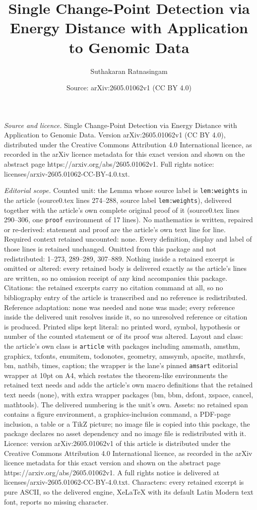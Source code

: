 \documentclass[10pt,a4paper]{amsart}
\title[Single Change-Point Detection via Energy Distance with Appli]{Single Change-Point Detection via Energy Distance with Application to Genomic Data}
\author{Suthakaran Ratnasingam}
\date{Source: arXiv:2605.01062v1 (CC BY 4.0)}
\begin{document}
\maketitle

\noindent\emph{Source and licence.} Single Change-Point Detection via Energy Distance with Application to Genomic Data. Version arXiv:2605.01062v1 (CC BY 4.0), distributed under the Creative Commons Attribution 4.0 International licence, as recorded in the arXiv licence metadata for this exact version and shown on the abstract page https://arxiv.org/abs/2605.01062v1. Full rights notice: licenses/arxiv-2605.01062-CC-BY-4.0.txt.\par\smallskip

\noindent\textit{Editorial scope.} Counted unit: the Lemma whose source label is \texttt{lem:weights} in the article (source0.tex lines 274--288, source label \texttt{lem:weights}), delivered together with the article's own complete original proof of it (source0.tex lines 290--306, one \texttt{proof} environment of 17 lines). No mathematics is written, repaired or re-derived: statement and proof are the article's own text line for line. Required context retained uncounted: none. Every definition, display and label of those lines is retained unchanged. Omitted from this package and not redistributed: 1--273, 289--289, 307--889. Nothing inside a retained excerpt is omitted or altered: every retained body is delivered exactly as the article's lines are written, so no omission receipt of any kind accompanies this package. Citations: the retained excerpts carry no citation command at all, so no bibliography entry of the article is transcribed and no reference is redistributed. Reference adaptation: none was needed and none was made; every reference inside the delivered unit resolves inside it, so no unresolved reference or citation is produced. Printed slips kept literal: no printed word, symbol, hypothesis or number of the counted statement or of its proof was altered. Layout and class: the article's own class is \texttt{article} with packages including amsmath, amsthm, graphicx, txfonts, enumitem, todonotes, geometry, amssymb, apacite, mathrsfs, bm, natbib, times, caption; the wrapper is the lane's pinned \texttt{amsart} editorial wrapper at 10pt on A4, which restates the theorem-like environments the retained text needs and adds the article's own macro definitions that the retained text needs (none), with extra wrapper packages (bm, bbm, dsfont, xspace, cancel, mathtools). The delivered numbering is the unit's own. Assets: no retained span contains a figure environment, a graphics-inclusion command, a PDF-page inclusion, a table or a TikZ picture; no image file is copied into this package, the package declares no asset dependency and no image file is redistributed with it. Licence: version arXiv:2605.01062v1 of this article is distributed under the Creative Commons Attribution 4.0 International licence, as recorded in the arXiv licence metadata for this exact version and shown on the abstract page https://arxiv.org/abs/2605.01062v1. A full rights notice is delivered at licenses/arxiv-2605.01062-CC-BY-4.0.txt. Characters: every retained excerpt is pure ASCII, so the delivered engine, XeLaTeX with its default Latin Modern text font, reports no missing character.
\end{document}
